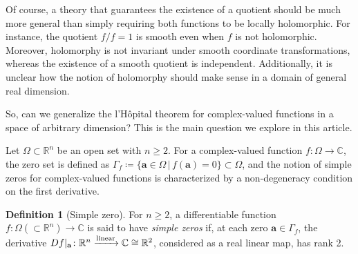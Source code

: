 \documentclass{article}
\newcommand{\Albert}[1]{{\color[rgb]{0.2,0.4,0.8}\textbf{Albert: } #1}}
\theoremstyle{theorem}
\theoremstyle{definition}
\newtheorem{definition}{Definition}
\def\CC{\mathbb{C}}
\def\RR{\mathbb{R}}
\def\ba{\mathbf{a}}
\begin{document}
Of course, a theory that guarantees the existence of a quotient should be much more general than simply requiring both functions to be locally holomorphic. For instance, the quotient \(f/f = 1\) is smooth even when \(f\) is not holomorphic. 
Moreover, holomorphy is not invariant under smooth coordinate transformations, whereas the existence of a smooth quotient is independent. Additionally, it is unclear how the notion of holomorphy should make sense in a domain of general real dimension. 

So, can we generalize the l'H\^opital theorem for complex-valued functions in a space of arbitrary dimension?  This is the main question we explore in this article. 



Let \(\Omega\subset\RR^n\) be an open set with \(n\geq 2\). For a complex-valued function \(f\colon\Omega\to\CC\), the zero set is defined as \(\Gamma_f \coloneqq \{\ba\in\Omega\,|\, f(\ba) = 0\}\subset\Omega\), 
and the notion of simple zeros for complex-valued functions is characterized by a non-degeneracy condition on the first derivative.

\begin{definition}[Simple zero]
For $n\geq 2$, a differentiable function \(f\colon\Omega(\subset \RR^n) \to\CC\) is said to have \emph{simple zeros} if, at each zero \(\ba\in\Gamma_f\), the derivative \(Df|_{\ba}\colon\RR^n\xrightarrow{\rm linear}\CC\cong\RR^2\), considered as a real linear map, has rank 2. 
\end{definition}
\end{document}
